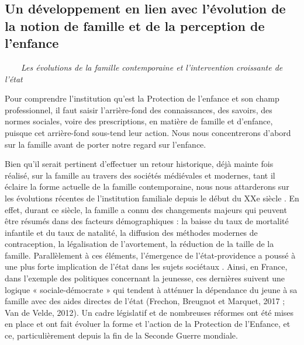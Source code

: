 \documentclass[
  12,
  a4paper,
]{report}
\begin{document}
\hypertarget{un-duxe9veloppement-en-lien-avec-luxe9volution-de-la-notion-de-famille-et-de-la-perception-de-lenfance}{%
\subsection{Un développement en lien avec l'évolution de la notion de
famille et de la perception de
l'enfance}\label{un-duxe9veloppement-en-lien-avec-luxe9volution-de-la-notion-de-famille-et-de-la-perception-de-lenfance}}

~~~~\emph{Les évolutions de la famille contemporaine et l'intervention
croissante de l'état}

Pour comprendre l'institution qu'est la Protection de l'enfance et son
champ professionnel, il faut saisir l'arrière-fond des connaissances,
des savoirs, des normes sociales, voire des prescriptions, en matière de
famille et d'enfance, puisque cet arrière-fond sous-tend leur action.
Nous nous concentrerons d'abord sur la famille avant de porter notre
regard sur l'enfance.

Bien qu'il serait pertinent d'effectuer un retour historique, déjà
mainte fois réalisé, sur la famille au travers des sociétés médiévales
et modernes, tant il éclaire la forme actuelle de la famille
contemporaine, nous nous attarderons sur les évolutions récentes de
l'institution familiale depuis le début du XXe siècle . En effet, durant
ce siècle, la famille a connu des changements majeurs qui peuvent être
résumés dans des facteurs démographiques : la baisse du taux de
mortalité infantile et du taux de natalité, la diffusion des méthodes
modernes de contraception, la légalisation de l'avortement, la réduction
de la taille de la famille. Parallèlement à ces éléments, l'émergence de
l'état-providence a poussé à une plus forte implication de l'état dans
les sujets sociétaux . Ainsi, en France, dans l'exemple des politiques
concernant la jeunesse, ces dernières suivent une logique «
sociale-démocrate » qui tendent à atténuer la dépendance du jeune à sa
famille avec des aides directes de l'état (Frechon, Breugnot et Marquet,
2017 ; Van de Velde, 2012). Un cadre législatif et de nombreuses
réformes ont été mises en place et ont fait évoluer la forme et l'action
de la Protection de l'Enfance, et ce, particulièrement depuis la fin de
la Seconde Guerre mondiale.
\end{document}

